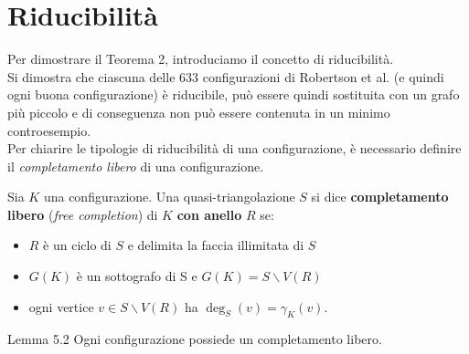 \documentclass[a4paper,12pt,titlepage]{report}
\begin{document}
    \section{Riducibilità}
    Per dimostrare il Teorema 2, introduciamo il concetto di riducibilità.
    \\Si dimostra che ciascuna delle 633 configurazioni di Robertson et al. (e quindi ogni buona configurazione) è riducibile, può essere quindi sostituita con un grafo più piccolo e di conseguenza non può essere contenuta in un minimo controesempio.
    \\Per chiarire le tipologie di riducibilità di una configurazione, è necessario definire il \emph{completamento libero} di una configurazione.
    \begin{dfn}
    	Sia $K$ una configurazione. Una quasi-triangolazione $S$ si dice {\bfseries completamento libero} (\emph{free completion}) di $K$ {\bfseries con anello} $R$ se:
    	\begin{itemize}
    		\item $R$ è un ciclo di $S$ e delimita la faccia illimitata di $S$
    		\item $G(K)$ è un sottografo di S e $G(K) = S \smallsetminus V(R)$
    		\item ogni vertice $v \in S \smallsetminus V(R)$ ha $\deg_S(v) = \gamma_K(v)$.
    	\end{itemize}
    \end{dfn}
    \begin{namedthm*}{Lemma 5.2}
    	Ogni configurazione possiede un completamento libero.
    \end{namedthm*}
\end{document}
